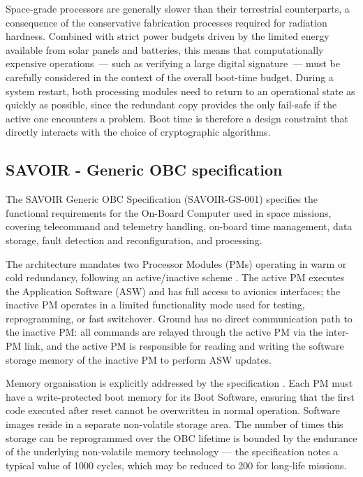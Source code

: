 Space-grade processors are generally slower than their terrestrial counterparts, a consequence of the conservative fabrication processes required for radiation hardness. Combined with strict power budgets driven by the limited energy available from solar panels and batteries, this means that computationally expensive operations~--- such as verifying a large digital signature~--- must be carefully considered in the context of the overall boot-time budget. During a system restart, both processing modules need to return to an operational state as quickly as possible, since the redundant copy provides the only fail-safe if the active one encounters a problem. Boot time is therefore a design constraint that directly interacts with the choice of cryptographic algorithms.

\subsection{SAVOIR - Generic OBC specification}
\label{subsection:bg-space-genericOBC}

The SAVOIR Generic OBC Specification \cite{SAVOIR} (SAVOIR-GS-001) specifies the functional requirements for the On-Board Computer used in space missions, covering telecommand and telemetry handling, on-board time management, data storage, fault detection and reconfiguration, and processing.

The architecture mandates two Processor Modules (PMs) operating in warm or cold redundancy, following an active/inactive scheme \cite{SAVOIR}. The active PM executes the Application Software (ASW) and has full access to avionics interfaces; the inactive PM operates in a limited functionality mode used for testing, reprogramming, or fast switchover. Ground has no direct communication path to the inactive PM: all commands are relayed through the active PM via the inter-PM link, and the active PM is responsible for reading and writing the software storage memory of the inactive PM to perform ASW updates.

Memory organisation is explicitly addressed by the specification \cite{SAVOIR}. Each PM must have a write-protected boot memory for its Boot Software, ensuring that the first code executed after reset cannot be overwritten in normal operation. Software images reside in a separate non-volatile storage area. The number of times this storage can be reprogrammed over the OBC lifetime is bounded by the endurance of the underlying non-volatile memory technology — the specification notes a typical value of 1000 cycles, which may be reduced to 200 for long-life missions.

